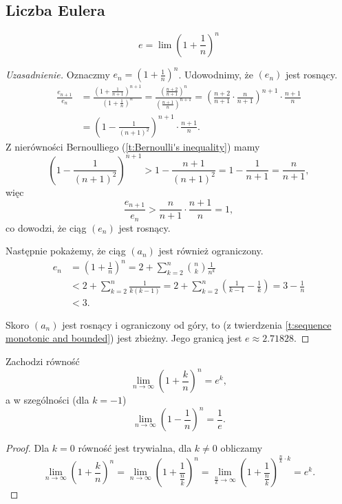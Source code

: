 \subsection{Liczba Eulera}
\begin{definition}
    \[ e = \lim \left(1 + \frac{1}{n}\right)^n \]
\end{definition}
\begin{proof}[Uzasadnienie]
    Oznaczmy $e_n = \left(1 + \frac{1}{n}\right)^n$. Udowodnimy, że $(e_n)$ jest rosnący.
    \[\begin{aligned}
        \frac{e_{n+1}}{e_n} &= \frac{\left(1 + \frac{1}{n+1}\right)^{n + 1}}{\left(1 + \frac{1}{n}\right)^n} = \frac{\left(\frac{n+ 2}{n+1}\right)^n}{\left(\frac{n+1}{n}\right)^{n+1}} = \left(\frac{n+2}{n+1} \cdot \frac{n}{n+1}\right)^{n+1} \cdot \frac{n+1}{n} \\
        &= \left(1 - \frac{1}{(n+1)^2}\right)^{n+1} \cdot \frac{n+1}{n}.
    \end{aligned}\]
    Z nierówności Bernoulliego (\ref{t:Bernoulli's inequality}) mamy
    \[ \left(1 - \frac{1}{(n+1)^2}\right)^{n+1} > 1 - \frac{n+1}{(n+1)^2} = 1 - \frac{1}{n+1} = \frac{n}{n+1}, \]
    więc
    \[ \frac{e_{n+1}}{e_n} > \frac{n}{n+1} \cdot \frac{n+1}{n} = 1, \]
    co dowodzi, że ciąg $(e_n)$ jest rosnący.

    Następnie pokażemy, że ciąg $(a_n)$ jest również ograniczony.
    \[\begin{aligned}
        e_n &= \left(1 + \frac{1}{n}\right)^n = 2 + \sum_{k=2}^n\binom{n}{k}\frac{1}{n^k} \\
        &< 2 + \sum_{k=2}^n\frac{1}{k(k-1)} = 2 + \sum_{k=2}^n\left(\frac{1}{k-1} - \frac{1}{k}\right) = 3 - \frac{1}{n} \\
        &< 3.
    \end{aligned}\]

    Skoro $(a_n)$ jest rosnący i ograniczony od góry, to (z twierdzenia \ref{t:sequence monotonic and bounded}) jest zbieżny. Jego granicą jest $e \approx 2.71828$.
\end{proof}

\begin{lemma}
    \label{l:lim e^k}
    Zachodzi równość
    \[ \lim_{n\to\infty}\left(1 + \frac{k}{n}\right)^n = e^k, \]
    a w szególności (dla $k = -1$)
    \[ \lim_{n\to\infty}\left(1 - \frac{1}{n}\right)^n = \frac{1}{e}. \]
\end{lemma}
\begin{proof}
    Dla $k = 0$ równość jest trywialna, dla $k \neq 0$ obliczamy
    \[ \lim_{n\to\infty}\left(1 + \frac{k}{n}\right)^n = \lim_{n\to\infty}\left(1 + \frac{1}{\frac{n}{k}}\right)^n = \lim_{\frac{n}{k}\to\infty}\left(1 + \frac{1}{\frac{n}{k}}\right)^{\frac{n}{k} \cdot k} = e^k. \]
\end{proof}


